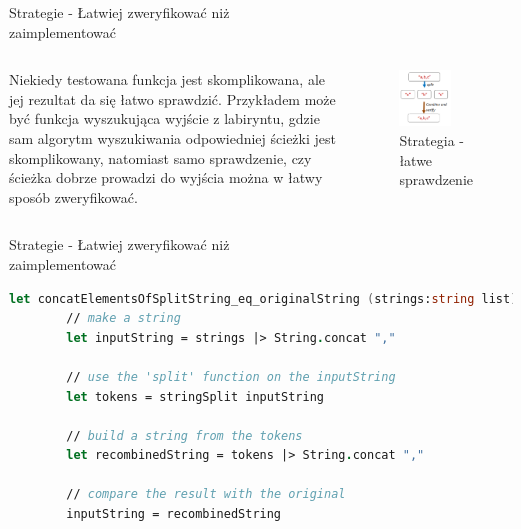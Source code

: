 \begin{frame}{Strategie - Łatwiej zweryfikować niż\\zaimplementować}
    \begin{columns}[t]
            Niekiedy testowana funkcja jest skomplikowana, ale jej rezultat da się łatwo sprawdzić. Przykładem może być funkcja wyszukująca wyjście z labiryntu, gdzie sam algorytm wyszukiwania odpowiedniej ścieżki jest skomplikowany, 
            natomiast samo sprawdzenie, czy ścieżka dobrze prowadzi do wyjścia można w łatwy sposób zweryfikować.
        \centering
        \begin{figure}
            \centering
            \includegraphics[width=0.7\textwidth]{images/property_string_split.png}
            \caption{Strategia - łatwe sprawdzenie}
            \label{fig:easy_verification_strategy_example}
        \end{figure}    
    \end{columns}
\end{frame}

\begin{frame}[fragile]{Strategie - Łatwiej zweryfikować niż\\zaimplementować}
    \begin{lstlisting}[language=FSharp, xleftmargin=-10pt,xrightmargin=-10pt,numbers=none, basicstyle=\ttfamily\small]
    let concatElementsOfSplitString_eq_originalString (strings:string list) =
        // make a string
        let inputString = strings |> String.concat ","
      
        // use the 'split' function on the inputString
        let tokens = stringSplit inputString
      
        // build a string from the tokens
        let recombinedString = tokens |> String.concat ","
      
        // compare the result with the original
        inputString = recombinedString
    \end{lstlisting}
\end{frame}

